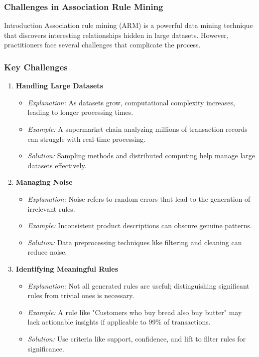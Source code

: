 \documentclass{beamer}
\begin{document}
\begin{frame}[fragile]
    \frametitle{Challenges in Association Rule Mining}
    \begin{block}{Introduction}
        Association rule mining (ARM) is a powerful data mining technique that discovers interesting relationships hidden in large datasets. However, practitioners face several challenges that complicate the process.
    \end{block}
\end{frame}

\begin{frame}[fragile]
    \frametitle{Key Challenges}
    \begin{enumerate}
        \item \textbf{Handling Large Datasets}
        \begin{itemize}
            \item \textit{Explanation:} As datasets grow, computational complexity increases, leading to longer processing times.
            \item \textit{Example:} A supermarket chain analyzing millions of transaction records can struggle with real-time processing.
            \item \textit{Solution:} Sampling methods and distributed computing help manage large datasets effectively.
        \end{itemize}

        \item \textbf{Managing Noise}
        \begin{itemize}
            \item \textit{Explanation:} Noise refers to random errors that lead to the generation of irrelevant rules.
            \item \textit{Example:} Inconsistent product descriptions can obscure genuine patterns.
            \item \textit{Solution:} Data preprocessing techniques like filtering and cleaning can reduce noise.
        \end{itemize}

        \item \textbf{Identifying Meaningful Rules}
        \begin{itemize}
            \item \textit{Explanation:} Not all generated rules are useful; distinguishing significant rules from trivial ones is necessary.
            \item \textit{Example:} A rule like "Customers who buy bread also buy butter" may lack actionable insights if applicable to 99\% of transactions.
            \item \textit{Solution:} Use criteria like support, confidence, and lift to filter rules for significance.
        \end{itemize}
    \end{enumerate}
\end{frame}
\end{document}
